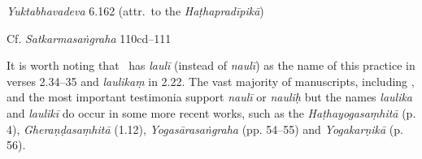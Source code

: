 \begin{ekdosis}
\begin{testimonia}[hp02_034]
\emph{Yuktabhavadeva} 6.162 (attr.~to the \emph{Haṭhapradīpikā})

\begin{versinnote}
\end{versinnote}

Cf. \emph{Satkarmasaṅgraha} 110cd–111

\begin{versinnote}
\end{versinnote}

\end{testimonia}

\begin{philcomm}[hp02_034]
It is worth noting that \alphaOne\ has \emph{laulī} (instead of \emph{naulī}) as the name of this practice in verses 2.34–35 and \emph{laulikaṃ} in 2.22. The vast majority of manuscripts, including \alphaTwo, and the most important testimonia support \emph{naulī} or \emph{nauliḥ} but the names \emph{laulika} and \emph{laulikī} do occur in some more recent works, such as the \emph{Haṭhayogasaṃhitā} (p. 4), \emph{Gheraṇḍasaṃhitā} (1.12), \emph{Yogasārasaṅgraha} (pp. 54–55) and \emph{Yogakarṇikā} (p. 56). \lb

\lb

\end{philcomm}


\end{ekdosis}
